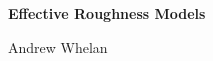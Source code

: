 \documentclass{article}
\begin{document}
\renewcommand{\thesection}{\Alph{section}}
\begin{titlepage}
   \centering

   {\Large\bfseries Effective Roughness Models \par}

   {\Large Andrew Whelan \par}
   \vspace{0.2cm}

   \tableofcontents
   \vspace*{\fill}  %
\end{titlepage}

%
\vspace*{-5ex}
{
\renewcommand{\arraystretch}{1.45}
\glsaddall
\printglossary[style=long, nonumberlist]
}
\end{document}

